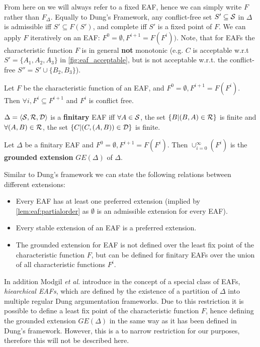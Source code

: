 From here on we will always refer to a fixed \gls{EAF}, hence we can simply write $F$ rather than $F_\Delta$. Equally to Dung's Framework, any conflict-free set $S' \subseteq \S$ in $\Delta$ is admissible iff $S' \subseteq F(S')$, and complete iff $S'$ is a fixed point of $F$. We can apply $F$ iteratively on an \gls{EAF}: $F^0 = \emptyset, F^{i+1} = F(F^i))$. Note, that for \glspl{EAF} the characteristic function $F$ is in general \textbf{not} monotonic (e.g. $C$ is acceptable w.r.t $S'= \{A_1, A_2, A_3\}$ in \autoref{fig:eaf_acceptable}, but is not acceptable w.r.t. the conflict-free $S'' = S' \cup \{B_2, B_3\}$).
\begin{lemma}
Let $F$ be the characteristic function of an \gls{EAF}, and $F^0 = \emptyset, F^{i+1} = F(F^i)$. Then $\forall i, F^i \subseteq F^{i+1}$ and $F^i$ is conflict free.
\end{lemma}


\begin{definition}
	$\Delta = \langle \S, \R, \D \rangle$ is a \textbf{finitary} \gls{EAF} iff $\forall A \in \S$, the set $\{B | (B, A) \in \R\}$ is finite and $\forall (A, B) \in \R$, the set $\{C | (C, (A, B))\in \D\}$ is finite.
\end{definition}

\begin{definition}
	Let $\Delta$ be a finitary \gls{EAF} and $F^0 = \emptyset, F^{i+1} = F(F^i)$. Then $\cup_{i=0}^\infty(F^i)$ is the \textbf{grounded extension} $GE(\Delta)$ of $\Delta$.
\end{definition}


\begin{remark}
Similar to Dung's framework we can state the following relations between different extensions:
\begin{itemize}
	\item Every \gls{EAF} has at least one preferred extension (implied by \cref{lem:eaf:partialorder} as $\emptyset$ is an admissible extension for every \gls{EAF}).
	\item Every stable extension of an \gls{EAF} is a preferred extension.
	\item The grounded extension for \gls{EAF} is not defined over the least fix point of the characteristic function $F$, but can be defined for finitary \glspl{EAF} over the union of all characteristic functions $F^i$.
\end{itemize}	
\end{remark}

In addition Modgil \textit{et al.} introduce in \cite{Modgil2009} the concept of a special class of \glspl{EAF}, \textit{hiearchical \glspl{EAF}}, which are defined by the existence of a partition of $\Delta$ into multiple regular Dung argumentation frameworks. Due to this restriction it is possible to define a least fix point of the characteristic function $F$, hence defining the grounded extension $GE(\Delta)$ in the same way as it has been defined in Dung's framework. However, this is a to narrow restriction for our purposes, therefore this will not be described here. 


